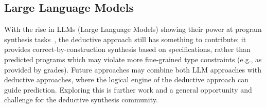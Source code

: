 \subsection{Large Language Models}
With the rise in LLMs (Large Language Models) showing their power at program
synthesis tasks~\citep{DBLP:journals/corr/abs-2108-07732,jain2021jigsaw}, the
deductive approach still has something to contribute: it provides
correct-by-construction synthesis based on specifications, rather than predicted
programs which may violate more fine-grained type constraints (e.g., as provided
by grades). Future approaches may combine both LLM approaches with deductive
approaches, where the logical engine of the deductive approach can guide
prediction. Exploring this is further work and a general opportunity and
challenge for the deductive synthesis community.